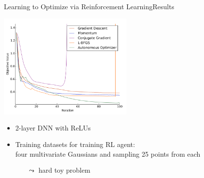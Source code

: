 \begin{frame}[c]{Learning to Optimize via Reinforcement Learning\newline Results }

\centering
\includegraphics[width=0.5\textwidth]{images/l2o_dnn}

\begin{itemize}
\item 2-layer DNN with ReLUs
\item Training datasets for training RL agent:\\ four multivariate Gaussians and sampling 25 points from each
\begin{itemize}
\item[$\leadsto$] hard toy problem
\end{itemize}
\end{itemize}

\end{frame}
